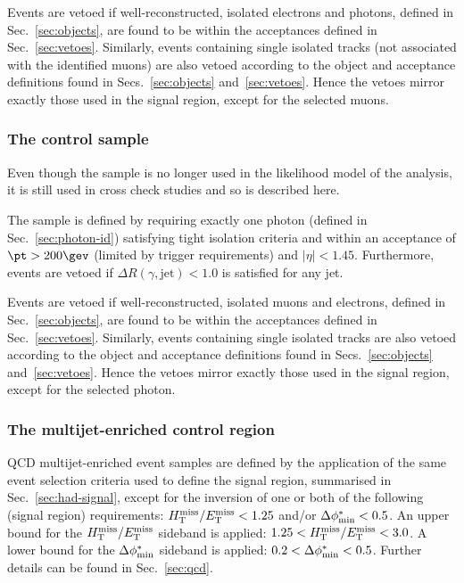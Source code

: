 Events are vetoed if well-reconstructed, isolated electrons and
photons, defined in Sec.~\ref{sec:objects}, are found to be within the
acceptances defined in Sec.~\ref{sec:vetoes}. Similarly, events
containing single isolated tracks (not associated with the identified
muons) are also vetoed according to the object and acceptance
definitions found in Secs.~\ref{sec:objects}
and~\ref{sec:vetoes}. Hence the vetoes mirror exactly those used in
the signal region, except for the selected muons.

\subsubsection{The \texorpdfstring{\gj}{photon + jets} control sample}
\label{sec:photoncontrolSelection}

Even though the \gj sample is no longer used in the likelihood model
of the analysis, it is still used in cross check studies and so is
described here.

The \gj sample is defined by requiring exactly one photon (defined in
Sec.~\ref{sec:photon-id}) satisfying tight isolation criteria and
within an acceptance of $\pt > 200\gev$ (limited by trigger
requirements) and $|\eta| < 1.45$. Furthermore, events are vetoed if
$\Delta R(\gamma,\textrm{jet}) < 1.0$ is satisfied for any jet.

Events are vetoed if well-reconstructed, isolated muons and electrons,
defined in Sec.~\ref{sec:objects}, are found to be within the
acceptances defined in Sec.~\ref{sec:vetoes}. Similarly, events
containing single isolated tracks are also vetoed according to the
object and acceptance definitions found in Secs.~\ref{sec:objects}
and~\ref{sec:vetoes}. Hence the vetoes mirror exactly those used in
the signal region, except for the selected photon.

\subsubsection{The multijet-enriched control region}
\label{sec:multijetcontrolSelection}

QCD multijet-enriched event samples are defined by the application of
the same event selection criteria used to define the signal region,
summarised in Sec.~\ref{sec:had-signal}, except for the inversion of
one or both of the following (signal region) requirements: $\mbox{$H_{\rm T}^{\rm miss}$}/\mbox{$E_\text{T}^{\rm miss}$}
< 1.25$ and/or $\mbox{$\Delta\phi^{*}_{\rm min}$} < 0.5$. An upper bound for the $\mbox{$H_{\rm T}^{\rm miss}$}/\mbox{$E_\text{T}^{\rm miss}$}$
sideband is applied: $1.25 < \mbox{$H_{\rm T}^{\rm miss}$}/\mbox{$E_\text{T}^{\rm miss}$} < 3.0$. A lower bound for the
$\mbox{$\Delta\phi^{*}_{\rm min}$}$ sideband is applied: $0.2 < \mbox{$\Delta\phi^{*}_{\rm min}$} < 0.5$. Further details
can be found in Sec.~\ref{sec:qcd}.

